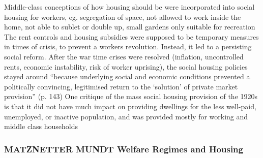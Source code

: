 \documentclass{article}
\begin{document}
\begin{outline}
			\3 Middle-class conceptions of how housing should be were incorporated into social housing for workers, eg. segregation of space, not allowed to work inside the home, not able to sublet or double up, small gardens only suitable for recreation
		\1 The rent controls and housing subsidies were supposed to be temporary measures in times of crisis, to prevent a workers revolution. Instead, it led to a persisting social reform. After the war time crises were resolved (inflation, uncontrolled rents, economic instability, risk of worker uprising), the social housing policies stayed around ``because underlying social and economic conditions prevented a politically convincing, legitimised return to the `solution' of private market provision'' (p. 143)
		\1 One critique of the mass social housing provision of the 1920s is that it did not have much impact on providing dwellings for the less well-paid, unemployed, or inactive population, and was provided mostly for working and middle class households
\end{outline}

\subsubsection{MATZNETTER MUNDT Welfare Regimes and Housing}
\end{document}
